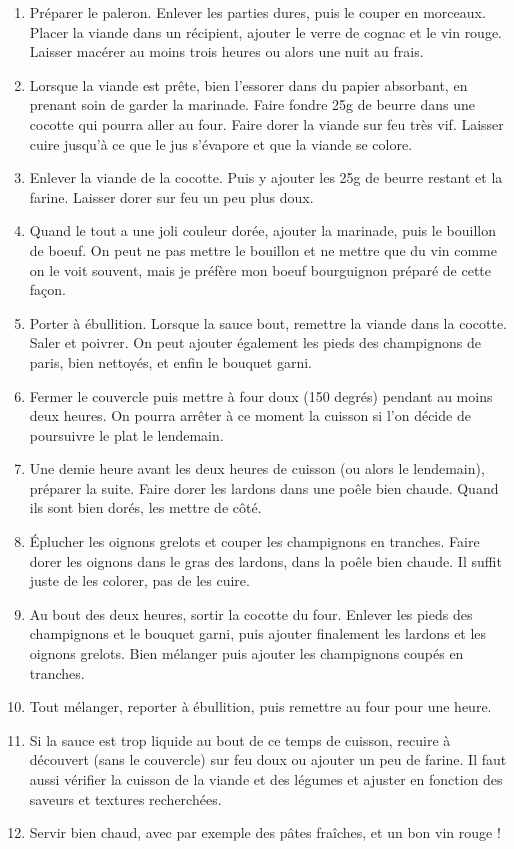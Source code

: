 {\begin{enumerate}
	\item Préparer le paleron. Enlever les parties dures, puis le couper en morceaux. Placer la viande dans un récipient, ajouter le verre de cognac et le vin rouge. Laisser macérer au moins trois heures ou alors une nuit au frais.
	\item Lorsque la viande est prête, bien l'essorer dans du papier absorbant, en prenant soin de garder la marinade. Faire fondre 25g de beurre dans une cocotte qui pourra aller au four. Faire dorer la viande sur feu très vif. Laisser cuire jusqu'à ce que le jus s'évapore et que la viande se colore.
	\item Enlever la viande de la cocotte. Puis y ajouter les 25g de beurre restant et la farine. Laisser dorer sur feu un peu plus doux.
	\item Quand le tout a une joli couleur dorée, ajouter la marinade, puis le bouillon de boeuf. On peut ne pas mettre le bouillon et ne mettre que du vin comme on le voit souvent, mais je préfère mon boeuf bourguignon préparé de cette façon. 
	\item Porter à ébullition. Lorsque la sauce bout, remettre la viande dans la cocotte. Saler et poivrer. On peut ajouter également les pieds des champignons de paris, bien nettoyés, et enfin le bouquet garni.
	\item Fermer le couvercle puis mettre à four doux (150 degrés) pendant au moins deux heures. On pourra arrêter à ce moment la cuisson si l'on décide de poursuivre le plat le lendemain.
	\item Une demie heure avant les deux heures de cuisson (ou alors le lendemain), préparer la suite. Faire dorer les lardons dans une poêle bien chaude. Quand ils sont bien dorés, les mettre de côté.
	\item Éplucher les oignons grelots et couper les champignons en tranches. Faire dorer les oignons dans le gras des lardons, dans la poêle bien chaude. Il suffit juste de les colorer, pas de les cuire.
	\item Au bout des deux heures, sortir la cocotte du four. Enlever les pieds des champignons et le bouquet garni, puis ajouter finalement les lardons et les oignons grelots. Bien mélanger puis ajouter les champignons coupés en tranches.
	\item Tout mélanger, reporter à ébullition, puis remettre au four pour une heure. 
	\item  Si la sauce est trop liquide au bout de ce temps de cuisson, recuire à découvert (sans le couvercle) sur feu doux ou ajouter un peu de farine. Il faut aussi vérifier la cuisson de la viande et des légumes et ajuster en fonction des saveurs et textures recherchées. 
	\item Servir bien chaud, avec par exemple des pâtes fraîches, et un bon vin rouge !
\end{enumerate}}

